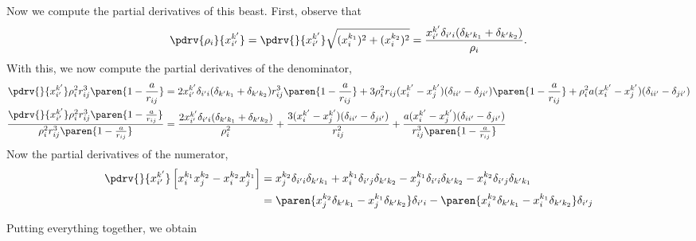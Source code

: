\documentclass[onecolumn,amsmath,amssymb,nofootinbib,floatfix]{revtex4}
\begin{document}
Now we compute the partial derivatives of this beast.  First, observe that
$$\pdrv{\rho_i}{x_{i'}^{k'}} = \pdrv{}{x_{i'}^{k'}}\sqrt{(x_i^{k_1})^2+(x_i^{k_2})^2} = \frac{x_{i'}^{k'}\delta_{i'i}(\delta_{k'k_1} + \delta_{k'k_2})}{\rho_i}.$$
With this, we now compute the partial derivatives of the denominator,
$$
\begin{aligned}
\pdrv{}{x_{i'}^{k'}} \rho_i^2 r_{ij}^3\paren{1-\frac{a}{r_{ij}}}
&=  2x_{i'}^{k'}\delta_{i'i}(\delta_{k'k_1} + \delta_{k'k_2}) r_{ij}^3\paren{1-\frac{a}{r_{ij}}}
      +3\rho_i^2 r_{ij}(x_i^{k'}-x_j^{k'})(\delta_{ii'}-\delta_{ji'})\paren{1-\frac{a}{r_{ij}}}
      + \rho_i^2 a (x_i^{k'}-x_j^{k'})(\delta_{ii'}-\delta_{ji'})\\
\frac{\pdrv{}{x_{i'}^{k'}} \rho_i^2 r_{ij}^3\paren{1-\frac{a}{r_{ij}}}}{\rho_i^2 r_{ij}^3\paren{1-\frac{a}{r_{ij}}}}
&=  \frac{2x_{i'}^{k'}\delta_{i'i}(\delta_{k'k_1} + \delta_{k'k_2})}{\rho_i^2}
      +\frac{3(x_i^{k'}-x_j^{k'})(\delta_{ii'}-\delta_{ji'})}{r_{ij}^2}
      + \frac{a (x_i^{k'}-x_j^{k'})(\delta_{ii'}-\delta_{ji'})}{r_{ij}^3\paren{1-\frac{a}{r_{ij}}}}\\
\end{aligned}
$$
Now the partial derivatives of the numerator,
$$
\begin{aligned}
\pdrv{}{x_{i'}^{k'}}\left[x_i^{k_1}x_j^{k_2}-x_i^{k_2}x_j^{k_1}\right]
&= 
x_j^{k_2}\delta_{i'i}\delta_{k'k_1}+x_i^{k_1}\delta_{i'j}\delta_{k'k_2}
-x_j^{k_1}\delta_{i'i}\delta_{k'k_2}-x_i^{k_2}\delta_{i'j}\delta_{k'k_1}\\
&= \paren{x_j^{k_2}\delta_{k'k_1}-x_j^{k_1}\delta_{k'k_2}}\delta_{i'i} - \paren{x_i^{k_2}\delta_{k'k_1}-x_i^{k_1}\delta_{k'k_2}}\delta_{i'j}
\end{aligned}
$$

Putting everything together, we obtain
\end{document}
